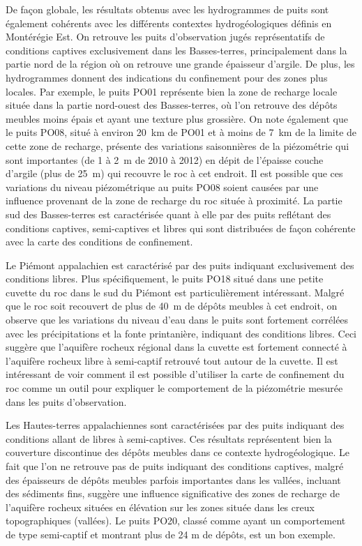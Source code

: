 \documentclass[WHATMANUAL.tex]{subfiles}
\begin{document}
De façon globale, les résultats obtenus avec les hydrogrammes de puits sont également cohérents avec les différents contextes hydrogéologiques définis en Montérégie Est. On retrouve les puits d’observation jugés représentatifs de conditions captives exclusivement dans les Basses-terres, principalement dans la partie nord de la région où on retrouve une grande épaisseur d’argile. De plus, les hydrogrammes donnent des indications du confinement pour des zones plus locales. Par exemple, le puits PO01 représente bien la zone de recharge locale située dans la partie nord-ouest des Basses-terres, où l'on retrouve des dépôts meubles moins épais et ayant une texture plus grossière. On note également que le puits PO08, situé à environ 20 km de PO01 et à moins de 7 km de la limite de cette zone de recharge, présente des variations saisonnières de la piézométrie qui sont importantes (de 1 à 2 m de 2010 à 2012) en dépit de l'épaisse couche d'argile (plus de 25 m) qui recouvre le roc à cet endroit. Il est possible que ces variations du niveau piézométrique au puits PO08 soient causées par une influence provenant de la zone de recharge du roc située à proximité. La partie sud des Basses-terres est caractérisée quant à elle par des puits reflétant des conditions captives, semi-captives et libres qui sont distribuées de façon cohérente avec la carte des conditions de confinement.

Le Piémont appalachien est caractérisé par des puits indiquant exclusivement des conditions libres. Plus spécifiquement, le puits PO18 situé dans une petite cuvette du roc dans le sud du Piémont est particulièrement intéressant. Malgré que le roc soit recouvert de plus de 40 m de dépôts meubles à cet endroit, on observe que les variations du niveau d'eau dans le puits sont fortement corrélées avec les précipitations et la fonte printanière, indiquant des conditions libres. Ceci suggère que l'aquifère rocheux régional dans la cuvette est fortement connecté à l'aquifère rocheux libre à semi-captif retrouvé tout autour de la cuvette. Il est intéressant de voir comment il est possible d'utiliser la carte de confinement  du roc comme un outil pour expliquer le comportement de la piézométrie mesurée dans les puits d'observation.

Les Hautes-terres appalachiennes sont caractérisées par des puits indiquant des conditions allant de libres à semi-captives. Ces résultats représentent bien la couverture discontinue des dépôts meubles dans ce contexte hydrogéologique. Le fait que l'on ne retrouve pas de puits indiquant des conditions captives, malgré des épaisseurs de dépôts meubles parfois importantes dans les vallées, incluant des sédiments fins, suggère une influence significative des zones de recharge de l’aquifère rocheux situées en élévation sur les zones située dans les creux topographiques (vallées). Le puits PO20, classé comme ayant un comportement de type semi-captif et montrant plus de 24 m de dépôts, est un bon exemple.
\end{document}
